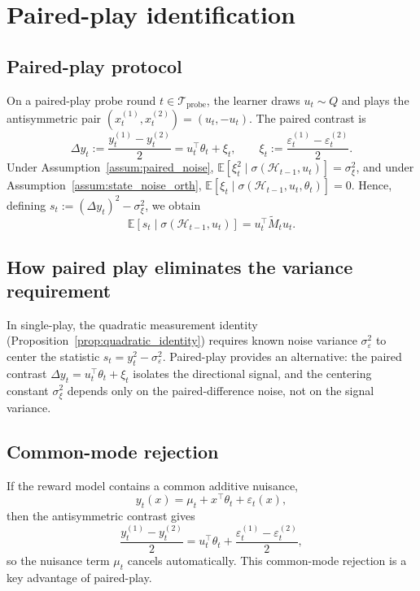 \documentclass[12pt]{article}
\newcommand{\E}{\mathbb{E}}
\newcommand{\cH}{\mathcal{H}}
\newcommand{\cTprobe}{\mathcal{T}_{\mathrm{probe}}}
\theoremstyle{plain}
\theoremstyle{definition}
\begin{document}
\section{Paired-play identification}
\label{sec:paired_play_id}

\subsection{Paired-play protocol}

On a paired-play probe round $t \in \cTprobe$, the learner draws $u_t \sim Q$ and plays the antisymmetric pair $(x_t^{(1)}, x_t^{(2)}) = (u_t, -u_t)$. The paired contrast is
\[
\Delta y_t := \frac{y_t^{(1)} - y_t^{(2)}}{2} = u_t^\top \theta_t + \xi_t,
\qquad
\xi_t := \frac{\varepsilon_t^{(1)} - \varepsilon_t^{(2)}}{2}.
\]
Under Assumption~\ref{assum:paired_noise}, $\E[\xi_t^2 \mid \sigma(\cH_{t-1}, u_t)] = \sigma_\xi^2$, and under Assumption~\ref{assum:state_noise_orth}, $\E[\xi_t \mid \sigma(\cH_{t-1}, u_t, \theta_t)] = 0$. Hence, defining $s_t := (\Delta y_t)^2 - \sigma_\xi^2$, we obtain
\begin{equation}
\E[s_t \mid \sigma(\cH_{t-1}, u_t)] = u_t^\top \widetilde{M}_t u_t.
\label{eq:paired_quadratic}
\end{equation}

\subsection{How paired play eliminates the variance requirement}

In single-play, the quadratic measurement identity (Proposition~\ref{prop:quadratic_identity}) requires known noise variance $\sigma_\varepsilon^2$ to center the statistic $s_t = y_t^2 - \sigma_\varepsilon^2$. Paired-play provides an alternative: the paired contrast $\Delta y_t = u_t^\top \theta_t + \xi_t$ isolates the directional signal, and the centering constant $\sigma_\xi^2$ depends only on the paired-difference noise, not on the signal variance.

\subsection{Common-mode rejection}

If the reward model contains a common additive nuisance,
\[
y_t(x) = \mu_t + x^\top \theta_t + \varepsilon_t(x),
\]
then the antisymmetric contrast gives
\[
\frac{y_t^{(1)} - y_t^{(2)}}{2} = u_t^\top \theta_t + \frac{\varepsilon_t^{(1)} - \varepsilon_t^{(2)}}{2},
\]
so the nuisance term $\mu_t$ cancels automatically. This common-mode rejection is a key advantage of paired-play.
\end{document}

